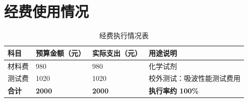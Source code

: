 \chapter{经费使用情况}

\begin{table}[H]
\centering
\caption{经费执行情况表}
\begin{tabularx}{\textwidth}{C{2.5cm}C{3cm}C{3cm}Y}
\toprule
科目 & 预算金额（元） & 实际支出（元） & 用途说明 \\
\midrule
材料费 & 980 & 980 & 化学试剂 \\
测试费 & 1020 & 1020 & 校外测试：吸波性能测试费用 \\

\midrule
\textbf{合计} & \textbf{2000} & \textbf{2000} & \textbf{执行率约 100\%} \\
\bottomrule
\end{tabularx}
\end{table}
